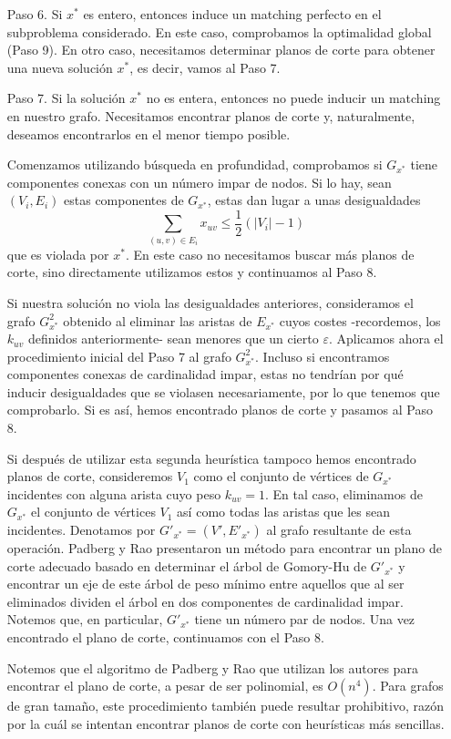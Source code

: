 \documentclass[twoside,a4paper,openright,12pt,tikz]{book}
\begin{document}
\begin{itemize}
\item[Paso 6.] Si $x^*$ es entero, entonces induce un matching perfecto en el subproblema considerado. En este caso, comprobamos la optimalidad global (Paso 9). En otro caso, necesitamos determinar planos de corte para obtener una nueva solución $x^*$, es decir, vamos al Paso 7.
\item[Paso 7.] Si la solución $x^*$ no es entera, entonces no puede inducir un matching en nuestro grafo. Necesitamos encontrar planos de corte y, naturalmente, deseamos encontrarlos en el menor tiempo posible.

Comenzamos utilizando búsqueda en profundidad, comprobamos si $G_{x^*}$ tiene componentes conexas con un número impar de nodos. Si lo hay, sean $(V_i,E_i)$ estas componentes de $G_{x^*}$, estas dan lugar a unas desigualdades
$$
\sum_{(u,v)\in E_i} x_{uv} \leq \frac{1}{2}(|V_i|-1)
$$ 
que es violada por $x^*$. En este caso no necesitamos buscar más planos de corte, sino directamente utilizamos estos y continuamos al Paso 8.

Si nuestra solución no viola las desigualdades anteriores, consideramos el grafo $G^2_{x^*}$ obtenido al eliminar las aristas de $E_{x^*}$ cuyos costes -recordemos, los $k_{uv}$ definidos anteriormente- sean menores que un cierto $\varepsilon$. Aplicamos ahora el procedimiento inicial del Paso 7 al grafo $G^2_{x^*}$. Incluso si encontramos componentes conexas de cardinalidad impar, estas no tendrían por qué inducir desigualdades que se violasen necesariamente, por lo que tenemos que comprobarlo. Si es así, hemos encontrado planos de corte y pasamos al Paso 8. 

Si después de utilizar esta segunda heurística tampoco hemos encontrado planos de corte, consideremos $V_1$ como el conjunto de vértices de $G_{x^*}$ incidentes con alguna arista cuyo peso $k_{uv}=1$. En tal caso, eliminamos de $G_{x^*}$ el conjunto de vértices $V_1$ así como todas las aristas que les sean incidentes. Denotamos por $G'_{x^*} =(V',E'_{x^*})$ al grafo resultante de esta operación. Padberg y Rao presentaron un método para encontrar un plano de corte adecuado \cite{rao} basado en determinar el árbol de Gomory-Hu de $G'_{x^*}$ y encontrar un eje de este árbol de peso mínimo entre aquellos que al ser eliminados dividen el árbol en dos componentes de cardinalidad impar. Notemos que, en particular, $G'_{x^*}$ tiene un número par de nodos.
Una vez encontrado el plano de corte, continuamos con el Paso 8.

Notemos que el algoritmo de Padberg y Rao que utilizan los autores para encontrar el plano de corte, a pesar de ser polinomial, es $O(n^4)$. Para grafos de gran tamaño, este procedimiento también puede resultar prohibitivo, razón por la cuál se intentan encontrar planos de corte con heurísticas más sencillas. 


\end{itemize}
\end{document}
